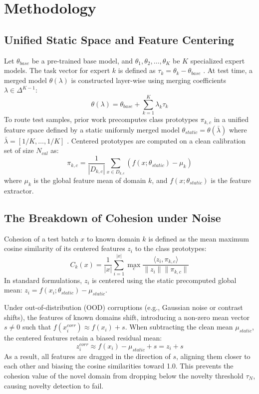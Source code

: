 \documentclass{article}
\theoremstyle{plain}
\theoremstyle{definition}
\theoremstyle{remark}
\begin{document}
\section{Methodology}

\subsection{Unified Static Space and Feature Centering}
Let $\theta_{base}$ be a pre-trained base model, and $\theta_1, \theta_2, \dots, \theta_K$ be $K$ specialized expert models. The task vector for expert $k$ is defined as $\tau_k = \theta_k - \theta_{base}$ \cite{ilharco2023editing}. At test time, a merged model $\theta(\lambda)$ is constructed layer-wise using merging coefficients $\lambda \in \Delta^{K-1}$:
\begin{equation}
    \theta(\lambda) = \theta_{base} + \sum_{k=1}^K \lambda_k \tau_k
\end{equation}
To route test samples, prior work precomputes class prototypes $\pi_{k,c}$ in a unified feature space defined by a static uniformly merged model $\theta_{static} = \theta(\bar{\lambda})$ where $\bar{\lambda} = [1/K, \dots, 1/K]$ \cite{iggs_ow}. Centered prototypes are computed on a clean calibration set of size $N_{cal}$ as:
\begin{equation}
    \pi_{k,c} = \frac{1}{|D_{k,c}|} \sum_{x \in D_{k,c}} (f(x; \theta_{static}) - \mu_k)
\end{equation}
where $\mu_k$ is the global feature mean of domain $k$, and $f(x; \theta_{static})$ is the feature extractor.

\subsection{The Breakdown of Cohesion under Noise}
Cohesion of a test batch $x$ to known domain $k$ is defined as the mean maximum cosine similarity of its centered features $z_i$ to the class prototypes:
\begin{equation}
    C_k(x) = \frac{1}{|x|} \sum_{i=1}^{|x|} \max_c \frac{\langle z_i, \pi_{k,c} \rangle}{\|z_i\| \|\pi_{k,c}\|}
\end{equation}
In standard formulations, $z_i$ is centered using the static precomputed global mean: $z_i = f(x_i; \theta_{static}) - \mu_{static}$. 

Under out-of-distribution (OOD) corruptions (e.g., Gaussian noise or contrast shifts), the features of known domains shift, introducing a non-zero mean vector $s \neq 0$ such that $f(x^{corr}_i) \approx f(x_i) + s$. When subtracting the clean mean $\mu_{static}$, the centered features retain a biased residual mean:
\begin{equation}
    z^{corr}_i \approx f(x_i) - \mu_{static} + s = z_i + s
\end{equation}
As a result, all features are dragged in the direction of $s$, aligning them closer to each other and biasing the cosine similarities toward 1.0. This prevents the cohesion value of the novel domain from dropping below the novelty threshold $\tau_N$, causing novelty detection to fail.
\end{document}
